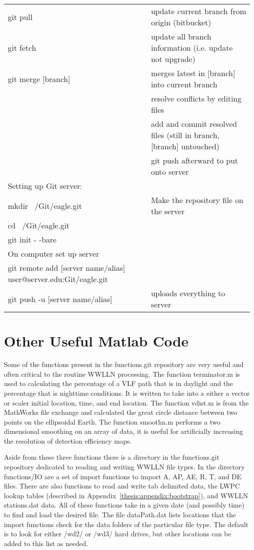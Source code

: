 \begin{landscape}
\begin{center}
\begin{longtable}{|p{4in}|p{4in}|}
git pull & update current branch from origin (bitbucket) \\
git fetch & update all branch information (i.e. update not upgrade) \\
git merge [branch] & merges latest in [branch] into current branch \\
& resolve conflicts by editing files \\
& add and commit resolved files (still in branch, [branch] untouched) \\
& git push afterward to put onto server \\
Setting up Git server: & \\
mkdir ~/Git/eagle.git & Make the repository file on the server \\
cd ~/Git/eagle.git & \\
git init - -bare & \\
On computer set up server & \\
git remote add [server name/alias] user@server.edu:Git/eagle.git & \\
git push -u [server name/alias] & uploads everything to server 
\label{label}
\end{longtable}
\end{center}
\end{landscape}

\section{Other Useful Matlab Code}

Some of the functions present in the functions.git repository are very useful and often critical to the routine WWLLN processing.
The function terminator.m is used to calculating the percentage of a VLF path that is in daylight and the percentage that is nighttime conditions.
It is written to take into a either a vector or scaler initial location, time, and end location.
The function vdist.m is from the MathWorks file exchange and calculated the great circle distance between two points on the ellipsoidal Earth.
The function smoothn.m performs a two dimensional smoothing on an array of data, it is useful for artificially increasing the resolution of detection efficiency maps.

Aside from these three functions there is a directory in the functions.git repository dedicated to reading and writing WWLLN file types.
In the directory functions/IO are a set of import functions to import A, AP, AE, R, T, and DE files.
There are also functions to read and write tab delimited data, the LWPC lookup tables (described in Appendix~\ref{thesis:appendix:bootstrap}), and WWLLN stations.dat data.
All of these functions take in a given date (and possibly time) to find and load the desired file.
The file dataPath.dat lists locations that the import functions check for the data folders of the particular file type.
The default is to look for either /wd2/ or /wd3/ hard drives, but other locations can be added to this list as needed.

